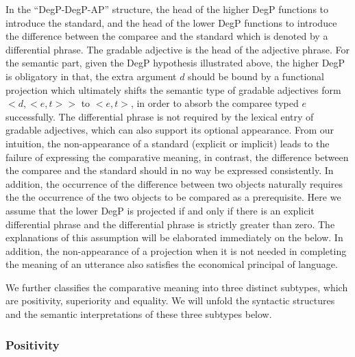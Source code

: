 \documentclass{ctexart}
\begin{document}
In the ``DegP-DegP-AP'' structure, the head of the higher DegP functions to introduce the standard, and the head of the lower DegP functions to introduce the difference between the comparee and the standard which is denoted by a differential phrase. The gradable adjective is the head of the adjective phrase. For the semantic part, given the DegP hypothesis illustrated above, the higher DegP is obligatory in that, the extra argument $d$ should be bound by a functional projection which ultimately shifts the semantic type of gradable adjectives form $<d,<e,t>>$ to $<e,t>$, in order to absorb the comparee typed $e$ successfully. The differential phrase is not required by the lexical entry of gradable adjectives, which can also support its optional appearance. From our intuition, the non-appearance of a standard (explicit or implicit) leads to the failure of expressing the comparative meaning, in contrast, the difference between the comparee and the standard should in no way be expressed consistently. In addition, the occurrence of the difference between two objects naturally requires the the occurrence of the two objects to be compared as a prerequisite. Here we assume that the lower DegP is projected if and only if there is an explicit differential phrase and the differential phrase is strictly greater than zero. The explanations of this assumption will be elaborated immediately on the below. In addition, the non-appearance of a projection when it is not needed in completing the meaning of an utterance also satisfies the economical principal of language.

We further classifies the comparative meaning into three distinct subtypes, which are positivity, superiority and equality. We will unfold the syntactic structures and the semantic interpretations of these three subtypes below.

\subsubsection{Positivity}
\end{document}
